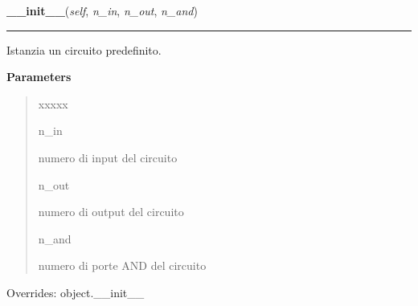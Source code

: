 \hspace{.8\funcindent}\begin{boxedminipage}{\funcwidth}

    \raggedright \textbf{\_\_init\_\_}(\textit{self}, \textit{n\_in}, \textit{n\_out}, \textit{n\_and})

    \vspace{-1.5ex}

    \rule{\textwidth}{0.5\fboxrule}
\setlength{\parskip}{2ex}
    Istanzia un circuito predefinito.

\setlength{\parskip}{1ex}
      \textbf{Parameters}
      \vspace{-1ex}

      \begin{quote}
        \begin{Ventry}{xxxxx}

          \item[n\_in]

          numero di input del circuito

          \item[n\_out]

          numero di output del circuito

          \item[n\_and]

          numero di porte AND del circuito

        \end{Ventry}

      \end{quote}

      Overrides: object.\_\_init\_\_

    \end{boxedminipage}

    \label{circuits:Circuit:generate_code}

    \vspace{0.5ex}

